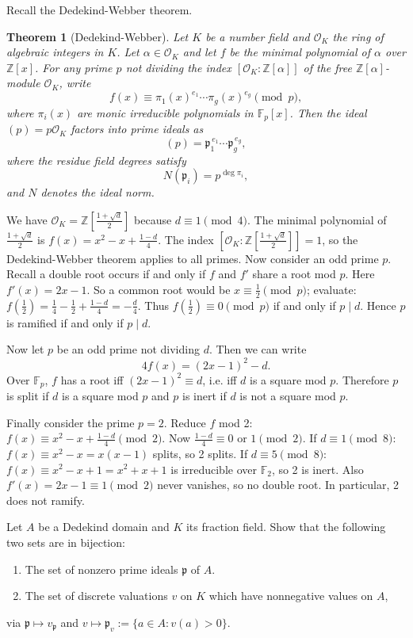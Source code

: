 \documentclass[12pt]{article}  %
\newtheorem{theorem}{Theorem}[section]
\begin{document}
\begin{solution}
    Recall the Dedekind-Webber theorem.\begin{theorem}[Dedekind-Webber]
        Let $K$ be a number field and $\mathcal{O}_K$ the ring of algebraic integers in $K$.
Let $\alpha \in \mathcal{O}_K$ and let $f$ be the minimal polynomial of $\alpha$ over $\mathbb{Z}[x]$.
For any prime $p$ not dividing the index $[\mathcal{O}_K : \mathbb{Z}[\alpha]]$ of the free
$\mathbb{Z}[\alpha]$-module $\mathcal{O}_K$, write
\[
   f(x) \equiv \pi_1(x)^{e_1}\cdots \pi_g(x)^{e_g} \pmod{p},
\]
where $\pi_i(x)$ are monic irreducible polynomials in $\mathbb{F}_p[x]$.
Then the ideal $(p) = p\mathcal{O}_K$ factors into prime ideals as
\[
   (p) = \mathfrak{p}_1^{\,e_1}\cdots \mathfrak{p}_g^{\,e_g},
\]
where the residue field degrees satisfy
\[
   N(\mathfrak{p}_i) = p^{\deg \pi_i},
\]
and $N$ denotes the ideal norm.
    \end{theorem}

We have $\mathcal{O}_K = \mathbb{Z}[\frac{1+\sqrt{d}}{2}]$ because $d\equiv 1\pmod 4$. The minimal polynomial of $\frac{1+\sqrt{d}}{2}$ is $f(x) = x^2 - x + \frac{1-d}{4}$. The index $[\mathcal{O}_K : \mathbb{Z}[\frac{1+\sqrt{d}}{2}]] = 1$, so the Dedekind-Webber theorem applies to all primes.
Now consider an odd prime $p$. Recall a double root occurs if and only if $f$ and $f'$ share a root mod $p$.
Here $f'(x)=2x-1$. 
So a common root would be $x\equiv \frac{1}{2}\pmod{p}$; evaluate:
$f\!\left(\frac{1}{2}\right)
=\frac{1}{4}-\frac{1}{2}+\frac{1-d}{4}
=-\frac{d}{4}$.
Thus $f(\frac{1}{2})\equiv0\pmod{p}$ if and only if $p\mid d$.
Hence $p$ is ramified if and only if $p\mid d$.

Now let $p$ be an odd prime not dividing $d$. Then we can write 
\[
4f(x)=(2x-1)^2-d.
\]
Over $\mathbb{F}_p$, $f$ has a root iff $(2x-1)^2\equiv d$, i.e. iff $d$ is a square mod $p$.
Therefore $p$ is split if $d$ is a square mod $p$ and $p$ is inert if $d$ is not a square mod $p$.

Finally consider the prime $p=2$. Reduce $f$ mod 2:
$f(x)\equiv x^2-x+\frac{1-d}{4}\pmod2$.
Now $\frac{1-d}{4}\equiv 0 \text{ or }1\pmod2$. If $d\equiv1\pmod8$: $f(x)\equiv x^2-x=x(x-1)$ splits, so 2 splits. If $d\equiv5\pmod8$: $f(x)\equiv x^2-x+1=x^2+x+1$ is irreducible over $\mathbb{F}_2$, so 2 is inert. Also $f'(x)=2x-1\equiv1\pmod2$ never vanishes, so no double root. In particular, 2 does not ramify.
\end{solution}

\begin{problem}{4}
Let $A$ be a Dedekind domain and $K$ its fraction field. Show that the following two sets are in bijection:
\begin{enumerate}
    \item The set of nonzero prime ideals $\mathfrak{p}$ of $A$.
    \item The set of discrete valuations $v$ on $K$ which have nonnegative values on $A$,
\end{enumerate}
via $\mathfrak{p} \mapsto v_{\mathfrak{p}}$ and $v \mapsto \mathfrak{p}_v := \{ a \in A : v(a) > 0 \}$.
\end{problem}
\end{document}
